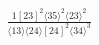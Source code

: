 \documentclass[varwidth, border=5pt]{standalone}
\begin{document}
\begin{my}
$\begin{gathered}
\scriptscriptstyle\frac{1[23]^2⟨35⟩^2⟨23⟩^2}{⟨13⟩⟨24⟩[24]^2⟨34⟩^3}
\end{gathered}$
\end{my}
\end{document}
